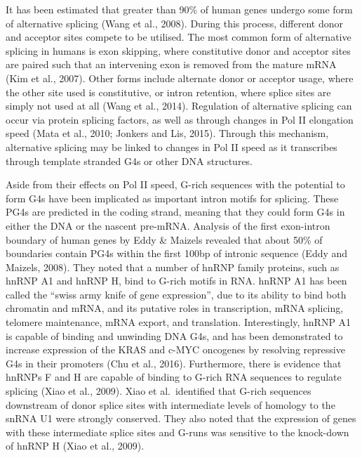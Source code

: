 \documentclass[12pt,a4paper,]{report}
\begin{document}
It has been estimated that greater than 90\% of human genes undergo some
form of alternative splicing (Wang et al., 2008). During this process,
different donor and acceptor sites compete to be utilised. The most
common form of alternative splicing in humans is exon skipping, where
constitutive donor and acceptor sites are paired such that an
intervening exon is removed from the mature mRNA (Kim et al., 2007).
Other forms include alternate donor or acceptor usage, where the other
site used is constitutive, or intron retention, where splice sites are
simply not used at all (Wang et al., 2014). Regulation of alternative
splicing can occur via protein splicing factors, as well as through
changes in Pol II elongation speed (Mata et al., 2010; Jonkers and Lis,
2015). Through this mechanism, alternative splicing may be linked to
changes in Pol II speed as it transcribes through template stranded G4s
or other DNA structures.

Aside from their effects on Pol II speed, G-rich sequences with the
potential to form G4s have been implicated as important intron motifs
for splicing. These PG4s are predicted in the coding strand, meaning
that they could form G4s in either the DNA or the nascent pre-mRNA.
Analysis of the first exon-intron boundary of human genes by Eddy \&
Maizels revealed that about 50\% of boundaries contain PG4s within the
first 100bp of intronic sequence (Eddy and Maizels, 2008). They noted
that a number of hnRNP family proteins, such as hnRNP A1 and hnRNP H,
bind to G-rich motifs in RNA. hnRNP A1 has been called the ``swiss army
knife of gene expression'', due to its ability to bind both chromatin
and mRNA, and its putative roles in transcription, mRNA splicing,
telomere maintenance, mRNA export, and translation. Interestingly, hnRNP
A1 is capable of binding and unwinding DNA G4s, and has been
demonstrated to increase expression of the KRAS and c-MYC oncogenes by
resolving repressive G4s in their promoters (Chu et al., 2016).
Furthermore, there is evidence that hnRNPs F and H are capable of
binding to G-rich RNA sequences to regulate splicing (Xiao et al.,
2009). Xiao et al.~identified that G-rich sequences downstream of donor
splice sites with intermediate levels of homology to the snRNA U1 were
strongly conserved. They also noted that the expression of genes with
these intermediate splice sites and G-runs was sensitive to the
knock-down of hnRNP H (Xiao et al., 2009).
\end{document}
